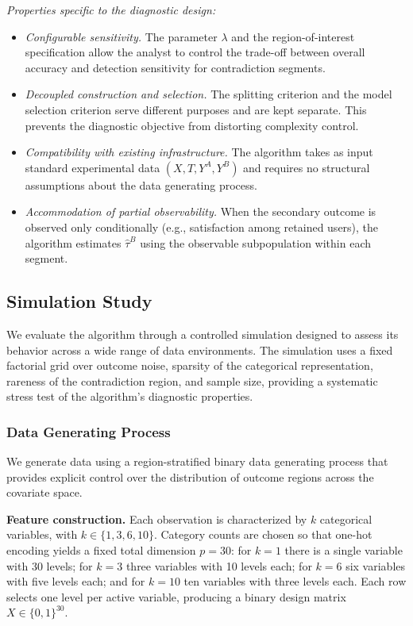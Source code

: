 \documentclass[11pt,letterpaper,english]{article}
\theoremstyle{definition}
\theoremstyle{definition}
\begin{document}
\begin{bibunit}
\vspace{4pt}
\noindent
\emph{Properties specific to the diagnostic design:}
\begin{itemize}[leftmargin=2em]
    \item \emph{Configurable sensitivity.} The parameter $\lambda$ and the region-of-interest specification allow the analyst to control the trade-off between overall accuracy and detection sensitivity for contradiction segments.
    \item \emph{Decoupled construction and selection.} The splitting criterion and the model selection criterion serve different purposes and are kept separate. This prevents the diagnostic objective from distorting complexity control.
    \item \emph{Compatibility with existing infrastructure.} The algorithm takes as input standard experimental data $(X, T, Y^A, Y^B)$ and requires no structural assumptions about the data generating process.
    \item \emph{Accommodation of partial observability.} When the secondary outcome is observed only conditionally (e.g., satisfaction among retained users), the algorithm estimates $\hat{\tau}^B$ using the observable subpopulation within each segment.
\end{itemize}


\subsection{Simulation Study}
\label{sec:simulation}

We evaluate the algorithm through a controlled simulation designed to assess its behavior across a wide range of data environments. The simulation uses a fixed factorial grid over outcome noise, sparsity of the categorical representation, rareness of the contradiction region, and sample size, providing a systematic stress test of the algorithm's diagnostic properties.

\subsubsection{Data Generating Process}
\label{sec:dgp}

We generate data using a region-stratified binary data generating process that provides explicit control over the distribution of outcome regions across the covariate space.

\vspace{6pt}
\noindent
\textbf{Feature construction.}
Each observation is characterized by $k$ categorical variables, with $k \in \{1,3,6,10\}$. Category counts are chosen so that one-hot encoding yields a fixed total dimension $p=30$: for $k=1$ there is a single variable with 30 levels; for $k=3$ three variables with 10 levels each; for $k=6$ six variables with five levels each; and for $k=10$ ten variables with three levels each. Each row selects one level per active variable, producing a binary design matrix $X \in \{0,1\}^{30}$.


\end{bibunit}
\end{document}
